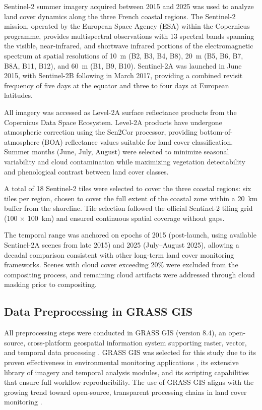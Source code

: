 \documentclass[coasts,article,accept,pdftex,moreauthors]{Definitions/mdpi}
\begin{document}
Sentinel-2 summer imagery acquired between 2015 and 2025 was used to analyze land cover dynamics along the three French coastal regions. The Sentinel-2 mission, operated by the European Space Agency (ESA) within the Copernicus programme, provides multispectral observations with 13 spectral bands spanning the visible, near-infrared, and shortwave infrared portions of the electromagnetic spectrum at spatial resolutions of 10~m (B2, B3, B4, B8), 20~m (B5, B6, B7, B8A, B11, B12), and 60~m (B1, B9, B10). Sentinel-2A was launched in June 2015, with Sentinel-2B following in March 2017, providing a combined revisit frequency of five days at the equator and three to four days at \linebreak  European latitudes.

All imagery was accessed as Level-2A surface reflectance products from the Copernicus Data Space Ecosystem. Level-2A products have undergone atmospheric correction using the Sen2Cor processor, providing bottom-of-atmosphere (BOA) reflectance values suitable for land cover classification. Summer months (June, July, August) were selected to minimize seasonal variability and cloud contamination while maximizing vegetation detectability and phenological contrast between land cover classes.

A total of 18 Sentinel-2 tiles were selected to cover the three coastal regions: six tiles per region, chosen to cover the full extent of the coastal zone within a 20~km buffer from the shoreline. Tile selection followed the official Sentinel-2 tiling grid (100 $\times$ 100~km) and ensured continuous spatial coverage without gaps. 

The temporal range was anchored on epochs of 2015 (post-launch, using available Sentinel-2A scenes from late 2015) and 2025 (July--August 2025), allowing a decadal comparison consistent with other long-term land cover monitoring frameworks. Scenes with cloud cover exceeding 20\% were excluded from the compositing process, and remaining cloud artifacts were addressed through cloud masking prior to compositing.

\subsection{Data Preprocessing in GRASS GIS}

All preprocessing steps were conducted in GRASS GIS (version 8.4), an open-source, cross-platform geospatial information system supporting raster, vector, and temporal data processing \citep{Neteler2012,MitasovaNeteler2004}. GRASS GIS was selected for this study due to its proven effectiveness in environmental monitoring applications \citep{Lemenkova2025Morocco}, its extensive library of imagery and temporal analysis modules, and its scripting capabilities that ensure full workflow reproducibility. The use of GRASS GIS aligns with the growing trend toward open-source, transparent processing chains in land cover monitoring \citep{Rocchini2016}.
\end{document}
